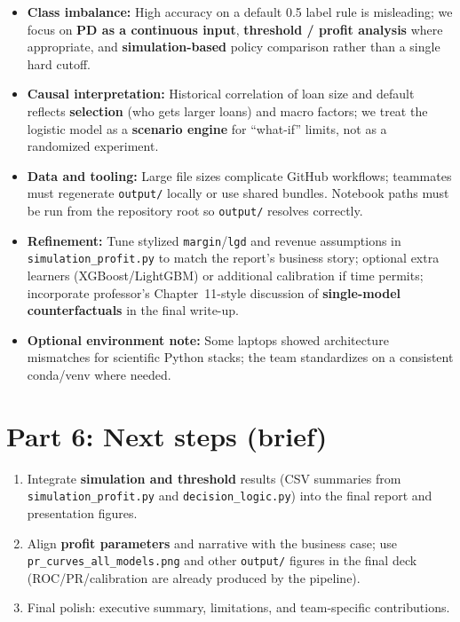 \documentclass[12pt,letterpaper]{report}
\begin{document}
\begin{itemize}
    \item \textbf{Class imbalance:} High accuracy on a default 0.5 label rule is misleading; we focus on \textbf{PD as a continuous input}, \textbf{threshold / profit analysis} where appropriate, and \textbf{simulation-based} policy comparison rather than a single hard cutoff.
    \item \textbf{Causal interpretation:} Historical correlation of loan size and default reflects \textbf{selection} (who gets larger loans) and macro factors; we treat the logistic model as a \textbf{scenario engine} for ``what-if'' limits, not as a randomized experiment.
    \item \textbf{Data and tooling:} Large file sizes complicate GitHub workflows; teammates must regenerate \texttt{output/} locally or use shared bundles. Notebook paths must be run from the repository root so \texttt{output/} resolves correctly.
    \item \textbf{Refinement:} Tune stylized \texttt{margin}/\texttt{lgd} and revenue assumptions in \texttt{simulation\_profit.py} to match the report's business story; optional extra learners (XGBoost/LightGBM) or additional calibration if time permits; incorporate professor's Chapter~11-style discussion of \textbf{single-model counterfactuals} in the final write-up.
    \item \textbf{Optional environment note:} Some laptops showed architecture mismatches for scientific Python stacks; the team standardizes on a consistent conda/venv where needed.
\end{itemize}

\section*{Part 6: Next steps (brief)}

\begin{enumerate}[label=\arabic*.]
    \item Integrate \textbf{simulation and threshold} results (CSV summaries from \texttt{simulation\_profit.py} and \texttt{decision\_logic.py}) into the final report and presentation figures.
    \item Align \textbf{profit parameters} and narrative with the business case; use \texttt{pr\_curves\_all\_models.png} and other \texttt{output/} figures in the final deck (ROC/PR/calibration are already produced by the pipeline).
    \item Final polish: executive summary, limitations, and team-specific contributions.
\end{enumerate}
\end{document}
